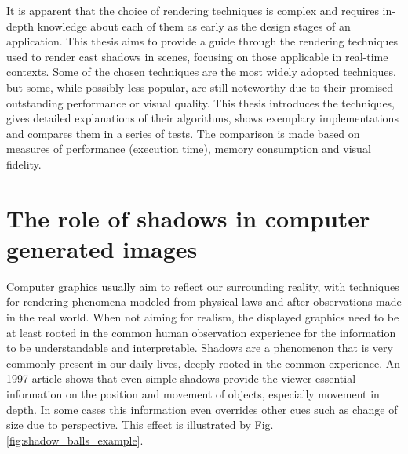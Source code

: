 It is apparent that the choice of rendering techniques is complex and requires in-depth knowledge about each of them as early as the design stages of an application. This thesis aims to provide a guide through the rendering techniques used to render cast shadows in scenes, focusing on those applicable in real-time contexts. Some of the chosen techniques are the most widely adopted techniques, but some, while possibly less popular, are  still noteworthy due to their promised outstanding performance or visual quality. This thesis introduces the techniques, gives detailed explanations of their algorithms, shows exemplary implementations and compares them in a series of tests. The comparison is made based on measures of performance (execution time), memory consumption and visual fidelity. %


\section{The role of shadows in computer generated images}

Computer graphics usually aim to reflect our surrounding reality, with techniques for rendering phenomena modeled from physical laws and after observations made in the real world. When not aiming for realism, the displayed graphics need to be at least rooted in the common human observation experience for the information to be understandable and interpretable. Shadows are a phenomenon that is very commonly present in our daily lives, deeply rooted in the common experience. An 1997 article \cite{bib:article:depth_shadows} shows that even simple shadows provide the viewer essential information on the position and movement of objects, especially movement in depth. In some cases this information even overrides other cues such as change of size due to perspective. This effect is illustrated by Fig. \ref{fig:shadow_balls_example}.

